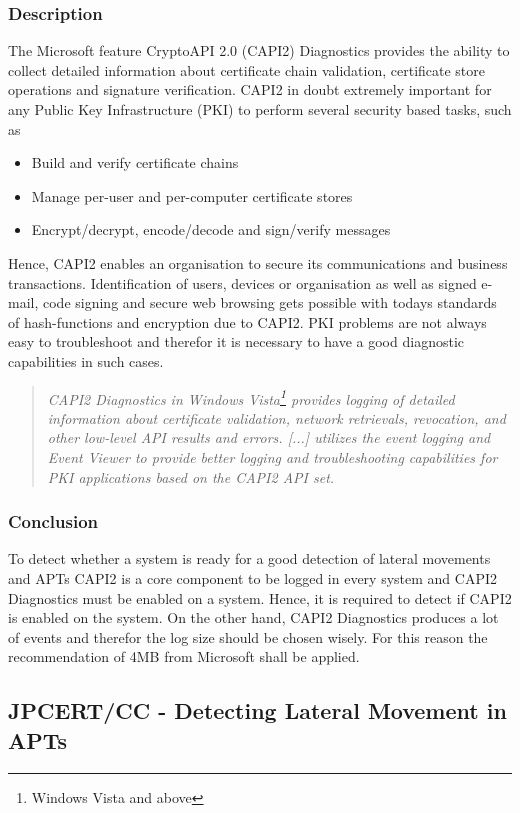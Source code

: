\subsubsection{Description}
The Microsoft feature CryptoAPI 2.0 (CAPI2) Diagnostics provides the ability to collect detailed information about certificate chain validation, certificate store operations and signature verification. CAPI2 in doubt extremely important for any Public Key Infrastructure (PKI) to perform several security based tasks, such as
\begin{itemize}
    \item Build and verify certificate chains
    \item Manage per-user and per-computer certificate stores
    \item Encrypt/decrypt, encode/decode and sign/verify messages
\end{itemize}
Hence, CAPI2 enables an organisation to secure its communications and business transactions. Identification of users, devices or organisation as well as signed e-mail, code signing and secure web browsing gets possible with todays standards of hash-functions and encryption due to CAPI2. PKI problems are not always easy to troubleshoot and therefor it is necessary to have a good diagnostic capabilities in such cases. 
\begin{quotation}
    \textit{CAPI2 Diagnostics in Windows Vista\footnote{Windows Vista and above} provides logging of detailed information about certificate validation, network retrievals, revocation, and other low-level API results and errors. [...] utilizes the event logging and Event Viewer to provide better logging and troubleshooting capabilities for PKI applications based on the CAPI2 API set. \cite{CAPI2}}
\end{quotation}
\subsubsection{Conclusion}
To detect whether a system is ready for a good detection of lateral movements and APTs CAPI2 is a core component to be logged in every system and CAPI2 Diagnostics must be enabled on a system. Hence, it is required to detect if CAPI2 is enabled on the system. On the other hand, CAPI2 Diagnostics produces a lot of events and therefor the log size should be chosen wisely. For this reason the recommendation of 4MB from Microsoft shall be applied. \cite{CAPI2}


\clearpage

\subsection{JPCERT/CC - Detecting Lateral Movement in APTs} \label{DetectingLateral}
